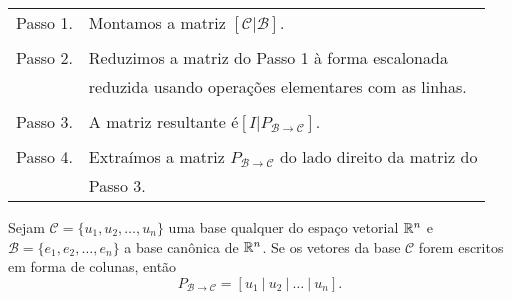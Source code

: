 \documentclass{beamer}
\begin{document}
\begin{frame}
    \begin{tcolorbox}[colback=green!30, colframe=green!80!blue, title=Procedimento para calcular $P_{\mathcal{B} \to \mathcal{C}}$]
        \begin{tabular}{ll}
            Passo 1. & Montamos a matriz $[\mathcal{C} | \mathcal{B}]$.\\
            \\
            Passo 2. & Reduzimos a matriz do Passo 1 à forma escalonada\\
            & reduzida usando operações elementares com as linhas.\\
            \\
            Passo 3. & A matriz resultante é$[I | P_{\mathcal{B} \to \mathcal{C}}]$.\\
            \\
            Passo 4. & Extraímos a matriz $P_{\mathcal{B} \to \mathcal{C}}$ do lado direito da matriz do\\
            & Passo 3.
        \end{tabular}
    \end{tcolorbox}
\end{frame}

\begin{frame}
    \begin{teorema}
        Sejam $\mathcal{C} = \{u_1, u_2, \dots, u_n\}$ uma base qualquer do espaço vetorial $\mathbb{R}^n$ e $\mathcal{B} = \{e_1, e_2, \dots, e_n\}$ a base canônica de $\mathbb{R}^n$. Se os vetores da base $\mathcal{C}$ forem escritos em forma de colunas, então
        \[
            P_{\mathcal{B} \to \mathcal{C}} = [u_1\ |\ u_2\ |\ \dots\ |\ u_n].
        \]
    \end{teorema}
\end{frame}
\end{document}

